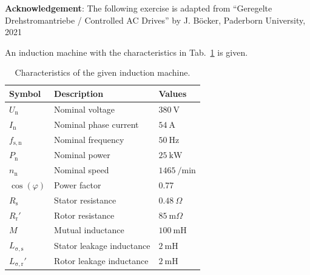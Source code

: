 

\normalsize{\textbf{Acknowledgement}: The following exercise is adapted from ``Geregelte Drehstromantriebe / Controlled AC Drives'' by J. Böcker, Paderborn University, 2021
}\\




An induction machine with the characteristics in Tab.~\ref{tab:characteristicsIM_task2} is given.
\begin{table}[htb]
    \caption{Characteristics of the given induction machine.}
    \centering
    \begin{tabular}{lll}\toprule
    Symbol  & Description       & Values \\
    \midrule
    $U_{\mathrm{n}}$    & Nominal voltage           & $\SI{380}{\volt}$ \\
    $I_{\mathrm{n}}$    & Nominal phase current     & $\SI{54}{\ampere}$ \\
    $f_{\mathrm{s,n}}$  & Nominal frequency         & $\SI{50}{\hertz}$ \\
    $P_{\mathrm{n}}$    & Nominal power             & $\SI{25}{\kilo\watt}$ \\
    $n_{\mathrm{n}}$    & Nominal speed             & $\SI{1465}{\per\minute}$ \\
    $\cos(\varphi)$     & Power factor              & 0.77 \\
    \midrule
    $R_{\mathrm{s}}$    & Stator resistance         & $\SI{0.48}{\Omega}$ \\
    $R_{\mathrm{r}}'$    & Rotor resistance          & $\SI{85}{\milli\Omega}$ \\
    $M$                 & Mutual inductance         & $\SI{100}{\milli\henry}$ \\
    $L_{\mathrm{\sigma,s}}$    & Stator leakage inductance  & $\SI{2}{\milli\henry}$ \\
    $L_{\mathrm{\sigma,r}}'$    & Rotor leakage inductance   & $\SI{2}{\milli\henry}$ \\
    \bottomrule
    \end{tabular}
    \label{tab:characteristicsIM_task2}
\end{table}


